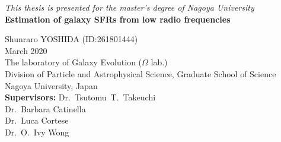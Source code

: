 \documentclass[12pt,a4paper,twoside,openright,final,titlepage]{report}
\newcommand\frontmatter{\pagenumbering{roman}}
\begin{document}
	\begin{titlepage}
		\centering
		\vfill
		\textit{This thesis is presented for the master's degree of Nagoya University}\\
        \vspace{5cm}
		{\bfseries\LARGE
				Estimation of galaxy SFRs from low radio frequencies \\}

        \vspace{1.5cm}

        \vspace{6cm}
        Shunraro YOSHIDA (ID:\@261801444)\\
		March 2020\\
        \vspace{0.5cm}
        The laboratory of Galaxy Evolution ($\Omega$ lab.)\\
        Division of Particle and Astrophysical Science, Graduate School of Science\\
        Nagoya University, Japan\\
        \vspace{1.5cm}
 		\textbf{Supervisors:}
 		    Dr.\ Tsutomu\ T.\ Takeuchi\\
 			Dr.\ Barbara Catinella\\
 			Dr.\ Luca Cortese\\
 			Dr.\ O.\ Ivy Wong\\
	\end{titlepage}
	\frontmatter
	\clearpage
	\thispagestyle{empty}
	\phantom{a}
	\vfill
	\vfill

%	
\end{document}
